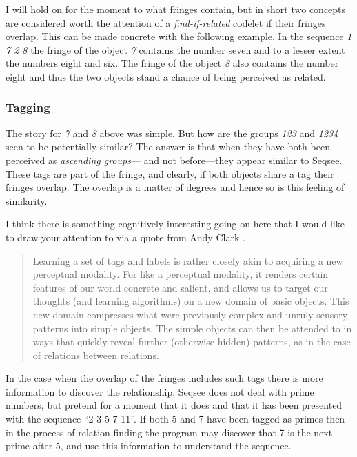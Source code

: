 \documentclass[letterpaper]{article}
\begin{document}
I will hold on for the moment to what fringes contain, but in short two concepts are considered worth the attention of a \emph{find-if-related} codelet if their fringes overlap.  This can be made concrete with the following example.  In the sequence \emph{1 7 2 8} the fringe of the object \emph{7} contains the number seven and to a lesser extent the numbers eight and six.  The fringe of the object \emph{8} also contains the number eight and thus the two objects stand a chance of being perceived as related.

\subsubsection{Tagging}
\label{sec:tagging}

The story for \emph{7} and \emph{8} above was simple.  But how are the groups \emph{123} and \emph{1234} seen to be potentially similar?  The answer is that when they have both been perceived as \emph{ascending groups}--- and not before---they appear similar to Seqsee.  These tags are part of the fringe, and clearly, if both objects share a tag their fringes overlap.  The overlap is a matter of degrees and hence so is this feeling of similarity.

I think there is something cognitively interesting going on here that I would like to draw your attention to via a quote from Andy Clark \cite{Clark:MindWare}.

\begin{quote}
Learning a set of tags and labels is rather closely akin to acquiring a new perceptual modality.  For like a perceptual modality, it renders certain features of our world concrete and salient, and allows us to target our thoughts (and learning algorithms) on a new domain of basic objects.  This new domain compresses what were previously complex and unruly sensory patterns into simple objects.  The simple objects can then be attended to in ways that quickly reveal further (otherwise hidden) patterns, as in the case of relations between relations.
\end{quote}


In the case when the overlap of the fringes includes such tags there is more information to discover the relationship.  Seqsee does not deal with prime numbers, but pretend for a moment that it does and that it has been presented with the sequence ``2 3 5 7 11''. If both 5 and 7 have been tagged as primes then in the process of relation finding the program may discover that 7 is the next prime after 5, and use this information to understand the sequence.
\end{document}
